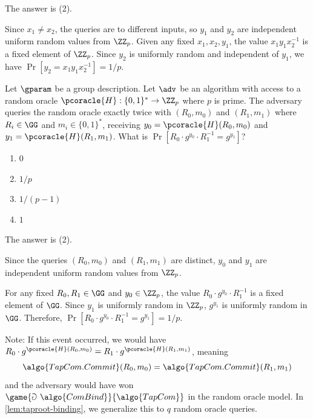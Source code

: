 \ifsolutions
\begin{mysolution}
  The answer is (2).
  
  Since $x_1 \neq x_2$, the queries are to different inputs, so $y_1$ and $y_2$ are independent uniform random values from $\ZZ_p$. 
  Given any fixed $x_1, x_2, y_1$, the value $x_1 y_1 x_2^{-1}$ is a fixed element of $\ZZ_p$.
  Since $y_2$ is uniformly random and independent of $y_1$, we have $\Pr[y_2 = x_1 y_1 x_2^{-1}] = 1/p$.
\end{mysolution}
\fi

\begin{exercise}
  Let $\gparam$ be a group description.
  Let $\adv$ be an algorithm with access to a random oracle $\pcoracle{H}: \{0,1\}^* \to \ZZ_p$ where $p$ is prime.
  The adversary queries the random oracle exactly twice with $(R_0, m_0)$ and $(R_1, m_1)$ where $R_i \in \GG$ and $m_i \in \{0,1\}^*$, receiving $y_0 = \pcoracle{H}(R_0, m_0)$ and $y_1 = \pcoracle{H}(R_1, m_1)$.
  What is $\Pr[R_0 \cdot g^{y_0} \cdot R_1^{-1} = g^{y_1}]$?
  \begin{enumerate}
    \item $0$
    \item $1/p$
    \item $1/(p-1)$
    \item $1$
  \end{enumerate}
\end{exercise}

\ifsolutions
\begin{mysolution}
  The answer is (2).
  
  Since the queries $(R_0, m_0)$ and $(R_1, m_1)$ are distinct, $y_0$ and $y_1$ are independent uniform random values from $\ZZ_p$.
  
  For any fixed $R_0, R_1 \in \GG$ and $y_0 \in \ZZ_p$, the value $R_0 \cdot g^{y_0} \cdot R_1^{-1}$ is a fixed element of $\GG$.
  Since $y_1$ is uniformly random in $\ZZ_p$, $g^{y_1}$ is uniformly random in $\GG$.
  Therefore, $\Pr[R_0 \cdot g^{y_0} \cdot R_1^{-1} = g^{y_1}] = 1/p$.
  
  Note: If this event occurred, we would have $R_0 \cdot g^{\pcoracle{H}(R_0, m_0)} = R_1 \cdot g^{\pcoracle{H}(R_1, m_1)}$, meaning
  \[
    \algo{TapCom.Commit}(R_0, m_0) = \algo{TapCom.Commit}(R_1, m_1)
  \] and the adversary would have won $\game{\Game~\algo{ComBind}}{\algo{TapCom}}$ in the random oracle model.
  In \autoref{lem:taproot-binding}, we generalize this to $q$ random oracle queries.
\end{mysolution}
\fi

